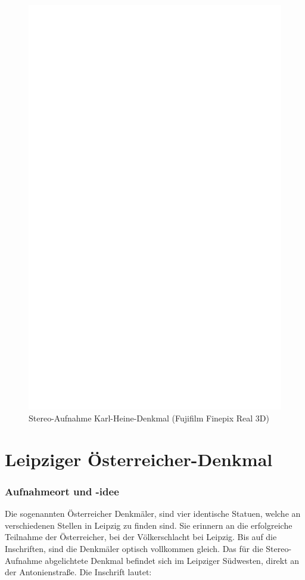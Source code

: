 \documentclass[liststotoc,bibtotoc,fontsize=14pt,]{scrreprt}
\begin{document}
\newpage
\begin{figure}[h]
	\includegraphics[width=\linewidth]{img/ph.jpg}
	\caption{Stereo-Aufnahme Karl-Heine-Denkmal (Fujifilm Finepix Real 3D)}
\end{figure}

\section{Leipziger Österreicher-Denkmal}
\label{sec:nikolai}
\subsubsection{Aufnahmeort und -idee}
Die sogenannten Österreicher Denkmäler, sind vier identische Statuen, welche an verschiedenen Stellen in Leipzig zu finden sind. Sie erinnern an die erfolgreiche Teilnahme der Österreicher, bei der Völkerschlacht bei Leipzig. Bis auf die Inschriften, sind die Denkmäler optisch vollkommen gleich. Das für die Stereo-Aufnahme abgelichtete Denkmal befindet sich im Leipziger Südwesten, direkt an der Antonienstraße. Die Inschrift lautet:
\end{document}
